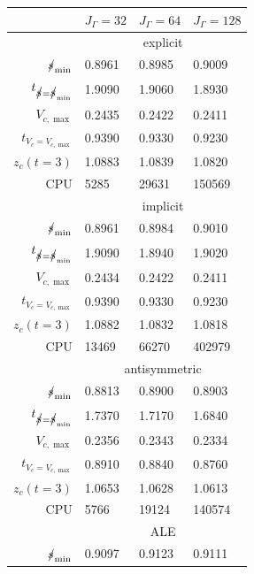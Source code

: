 \begin{table}
\center
\hspace*{-3.25cm}
\begin{tabular}{rlll}
\hline
 & $J_\Gamma=32$ & $J_\Gamma=64$ & $J_\Gamma=128$ \\
\hline
& \multicolumn{3}{c}{explicit} \\
\cmidrule{2-4}
$\mbox{$s\!\!\!\!\:/$}_{\min}$                & 0.8961 & 0.8985 & 0.9009 \\
$t_{\strikes = \strikes_{\min}}$ & 1.9090 & 1.9060 & 1.8930 \\
$V_{c,\max}$                     & 0.2435 & 0.2422 & 0.2411 \\
$t_{V_c = V_{c,\max}}$           & 0.9390 & 0.9330 & 0.9230 \\
$z_c(t=3)$                       & 1.0883 & 1.0839 & 1.0820 \\
CPU                              &   5285 &  29631 & 150569 \\
\cmidrule{2-4}
& \multicolumn{3}{c}{implicit} \\
\cmidrule{2-4}
$\mbox{$s\!\!\!\!\:/$}_{\min}$                & 0.8961 & 0.8984 & 0.9010 \\
$t_{\strikes = \strikes_{\min}}$ & 1.9090 & 1.8940 & 1.9020 \\
$V_{c,\max}$                     & 0.2434 & 0.2422 & 0.2411 \\
$t_{V_c = V_{c,\max}}$           & 0.9390 & 0.9330 & 0.9230 \\
$z_c(t=3)$                       & 1.0882 & 1.0832 & 1.0818 \\
CPU                              &  13469 &  66270 & 402979 \\
\cmidrule{2-4}
& \multicolumn{3}{c}{antisymmetric} \\
\cmidrule{2-4}
$\mbox{$s\!\!\!\!\:/$}_{\min}$                & 0.8813 & 0.8900 & 0.8903 \\
$t_{\strikes = \strikes_{\min}}$ & 1.7370 & 1.7170 & 1.6840 \\
$V_{c,\max}$                     & 0.2356 & 0.2343 & 0.2334 \\
$t_{V_c = V_{c,\max}}$           & 0.8910 & 0.8840 & 0.8760 \\
$z_c(t=3)$                       & 1.0653 & 1.0628 & 1.0613 \\
CPU                              &   5766 &  19124 & 140574 \\
\cmidrule{2-4}
& \multicolumn{3}{c}{ALE} \\
\cmidrule{2-4}
$\mbox{$s\!\!\!\!\:/$}_{\min}$                & 0.9097 & 0.9123 & 0.9111 \\

\end{tabular}
\end{table}
